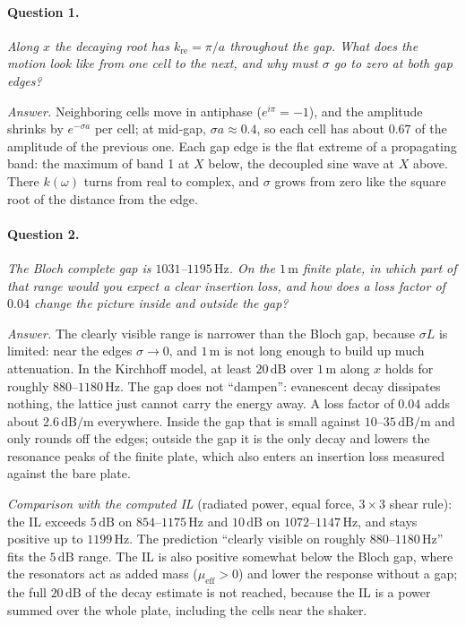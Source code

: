 \paragraph{Question 1.} \emph{Along $x$ the decaying root has $k_\mathrm{re} = \pi/a$
throughout the gap. What does the motion look like from one cell to the next, and why
must $\sigma$ go to zero at both gap edges?}

\emph{Answer.} Neighboring cells move in antiphase ($e^{i\pi} = -1$), and the
amplitude shrinks by $e^{-\sigma a}$ per cell; at mid-gap, $\sigma a \approx 0.4$, so
each cell has about $0.67$ of the amplitude of the previous one. Each gap edge is the
flat extreme of a propagating band: the maximum of band 1 at $X$ below, the decoupled
sine wave at $X$ above. There $k(\omega)$ turns from real to complex, and $\sigma$
grows from zero like the square root of the distance from the edge.

\paragraph{Question 2.} \emph{The Bloch complete gap is $1031$--$1195\,\mathrm{Hz}$. On
the $1\,\mathrm{m}$ finite plate, in which part of that range would you expect a clear
insertion loss, and how does a loss factor of $0.04$ change the picture inside and
outside the gap?}

\emph{Answer.} The clearly visible range is narrower than the Bloch gap, because
$\sigma L$ is limited: near the edges $\sigma \to 0$, and $1\,\mathrm{m}$ is not long
enough to build up much attenuation. In the Kirchhoff model, at least $20\,\mathrm{dB}$
over $1\,\mathrm{m}$ along $x$ holds for roughly $880$--$1180\,\mathrm{Hz}$. The gap does
not ``dampen'': evanescent decay dissipates nothing, the lattice just cannot carry the
energy away. A loss factor of $0.04$ adds about $2.6\,\mathrm{dB/m}$ everywhere. Inside
the gap that is small against $10$--$35\,\mathrm{dB/m}$ and only rounds off the edges;
outside the gap it is the only decay and lowers the resonance peaks of the finite
plate, which also enters an insertion loss measured against the bare plate.

\emph{Comparison with the computed IL} (radiated power, equal force, $3\times 3$ shear
rule): the IL exceeds $5\,\mathrm{dB}$ on $854$--$1175\,\mathrm{Hz}$ and $10\,\mathrm{dB}$
on $1072$--$1147\,\mathrm{Hz}$, and stays positive up to $1199\,\mathrm{Hz}$. The
prediction ``clearly visible on roughly $880$--$1180\,\mathrm{Hz}$'' fits the
$5\,\mathrm{dB}$ range. The IL is also positive somewhat below the Bloch gap, where the
resonators act as added mass ($\mu_\mathrm{eff} > 0$) and lower the response without a
gap; the full $20\,\mathrm{dB}$ of the decay estimate is not reached, because the IL is
a power summed over the whole plate, including the cells near the shaker.

